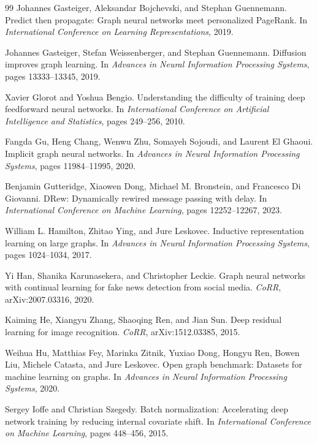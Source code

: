 \begin{thebibliography}{99}
Johannes Gasteiger, Aleksandar Bojchevski, and Stephan Guennemann.
\newblock Predict then propagate: Graph neural networks meet personalized PageRank.
\newblock In \emph{International Conference on Learning Representations}, 2019.

Johannes Gasteiger, Stefan Weissenberger, and Stephan Guennemann.
\newblock Diffusion improves graph learning.
\newblock In \emph{Advances in Neural Information Processing Systems}, pages 13333--13345, 2019.

Xavier Glorot and Yoshua Bengio.
\newblock Understanding the difficulty of training deep feedforward neural networks.
\newblock In \emph{International Conference on Artificial Intelligence and Statistics}, pages 249--256, 2010.

Fangda Gu, Heng Chang, Wenwu Zhu, Somayeh Sojoudi, and Laurent El Ghaoui.
\newblock Implicit graph neural networks.
\newblock In \emph{Advances in Neural Information Processing Systems}, pages 11984--11995, 2020.

Benjamin Gutteridge, Xiaowen Dong, Michael M. Bronstein, and Francesco Di Giovanni.
\newblock DRew: Dynamically rewired message passing with delay.
\newblock In \emph{International Conference on Machine Learning}, pages 12252--12267, 2023.

William L. Hamilton, Zhitao Ying, and Jure Leskovec.
\newblock Inductive representation learning on large graphs.
\newblock In \emph{Advances in Neural Information Processing Systems}, pages 1024--1034, 2017.

Yi Han, Shanika Karunasekera, and Christopher Leckie.
\newblock Graph neural networks with continual learning for fake news detection from social media.
\newblock \emph{CoRR}, arXiv:2007.03316, 2020.

Kaiming He, Xiangyu Zhang, Shaoqing Ren, and Jian Sun.
\newblock Deep residual learning for image recognition.
\newblock \emph{CoRR}, arXiv:1512.03385, 2015.

Weihua Hu, Matthias Fey, Marinka Zitnik, Yuxiao Dong, Hongyu Ren, Bowen Liu, Michele Catasta, and Jure Leskovec.
\newblock Open graph benchmark: Datasets for machine learning on graphs.
\newblock In \emph{Advances in Neural Information Processing Systems}, 2020.

Sergey Ioffe and Christian Szegedy.
\newblock Batch normalization: Accelerating deep network training by reducing internal covariate shift.
\newblock In \emph{International Conference on Machine Learning}, pages 448--456, 2015.


\end{thebibliography}
